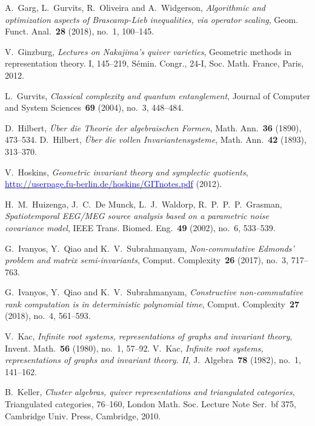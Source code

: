 \documentclass[11pt]{amsart}
\theoremstyle{definition}
\begin{document}
\begin{thebibliography}{99}
 A.~Garg, L.~Gurvits, R.~Oliveira and A.~Widgerson, {\it Algorithmic and optimization aspects of Brascamp-Lieb inequalities, via operator scaling}, Geom. Funct. Anal.~{\bf 28} (2018), no.~1, 100--145.

 V.~Ginzburg, {\it Lectures on Nakajima's quiver varieties}, Geometric methods in representation theory. I, 145--219, S\'emin. Congr., 24-I, Soc. Math. France, Paris, 2012.

 L.~Gurvits, {\it Classical complexity and quantum entanglement}, Journal of Computer and System Sciences~{\bf 69} (2004), no.~3, 448--484.

D.~Hilbert, {\it \"Uber die Theorie der algebraischen Formen}, Math. Ann.~{\bf 36} (1890), 473--534.
D.~Hilbert, {\it \"Uber die vollen Invariantensysteme}, Math. Ann.~{\bf 42} (1893), 313--370.

 V.~Hoskins, {\it Geometric invariant theory and symplectic quotients},\\ \href{http://userpage.fu-berlin.de/hoskins/GITnotes.pdf}{{\textcolor{blue}{http://userpage.fu-berlin.de/hoskins/GITnotes.pdf}}} (2012).

 H.~M.~Huizenga, J.~C.~De Munck, L.~J.~Waldorp, R.~P.~P.~P.~Grasman, {\it Spatiotemporal EEG/MEG source analysis based on a parametric noise covariance model}, IEEE Trans. Biomed. Eng.~{\bf 49} (2002), no.~6,  533--539.

 G.~Ivanyos, Y.~Qiao and K.~V.~Subrahmanyam, {\it Non-commutative Edmonds' problem and matrix semi-invariants}, Comput. Complexity~{\bf 26} (2017), no.~3, 717--763.

 G.~Ivanyos, Y.~Qiao and K.~V.~Subrahmanyam, {\it Constructive non-commutative rank computation is in deterministic polynomial time}, Comput. Complexity~{\bf 27} (2018), no.~4, 561--593.

 V.~Kac, {\it Infinite root systems, representations of graphs and invariant theory}, Invent. Math.~{\bf 56} (1980), no.~1, 57--92.
 V.~Kac, {\it Infinite root systems, representations of graphs and invariant theory. II}, J.~Algebra~{\bf 78} (1982), no.~1, 141--162.

 B.~Keller, {\it Cluster algebras, quiver representations and triangulated categories}, Triangulated categories, 76--160, London Math. Soc. Lecture Note Ser.~{bf 375}, Cambridge Univ. Press, Cambridge, 2010.



\end{thebibliography}
\end{document}
